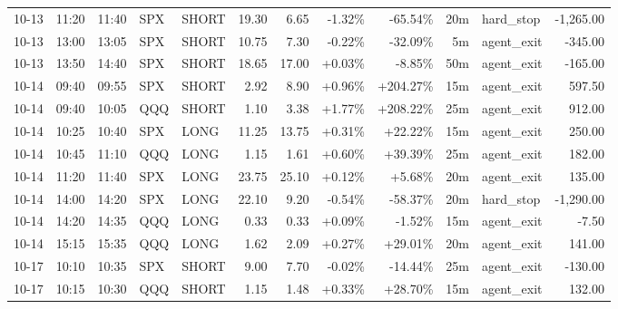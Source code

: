 \documentclass[11pt,a4paper]{article}
\begin{document}
\begin{center}
\begin{longtable}{>{\color{txtmain}}l l l l l r r r r r >{\color{txtmain}}l r}
10-13 & 11:20 & 11:40 & SPX & SHORT & 19.30 & 6.65 & \textcolor{lossred}{-1.32\%} & \textcolor{lossred}{-65.54\%} & 20m & hard\_stop & \textcolor{lossred}{-1,265.00} \\
10-13 & 13:00 & 13:05 & SPX & SHORT & 10.75 & 7.30 & \textcolor{lossred}{-0.22\%} & \textcolor{lossred}{-32.09\%} & 5m & agent\_exit & \textcolor{lossred}{-345.00} \\
10-13 & 13:50 & 14:40 & SPX & SHORT & 18.65 & 17.00 & \textcolor{wingreen}{+0.03\%} & \textcolor{lossred}{-8.85\%} & 50m & agent\_exit & \textcolor{lossred}{-165.00} \\
10-14 & 09:40 & 09:55 & SPX & SHORT & 2.92 & 8.90 & \textcolor{wingreen}{+0.96\%} & \textcolor{wingreen}{+204.27\%} & 15m & agent\_exit & \textcolor{wingreen}{597.50} \\
10-14 & 09:40 & 10:05 & QQQ & SHORT & 1.10 & 3.38 & \textcolor{wingreen}{+1.77\%} & \textcolor{wingreen}{+208.22\%} & 25m & agent\_exit & \textcolor{wingreen}{912.00} \\
10-14 & 10:25 & 10:40 & SPX & LONG & 11.25 & 13.75 & \textcolor{wingreen}{+0.31\%} & \textcolor{wingreen}{+22.22\%} & 15m & agent\_exit & \textcolor{wingreen}{250.00} \\
10-14 & 10:45 & 11:10 & QQQ & LONG & 1.15 & 1.61 & \textcolor{wingreen}{+0.60\%} & \textcolor{wingreen}{+39.39\%} & 25m & agent\_exit & \textcolor{wingreen}{182.00} \\
10-14 & 11:20 & 11:40 & SPX & LONG & 23.75 & 25.10 & \textcolor{wingreen}{+0.12\%} & \textcolor{wingreen}{+5.68\%} & 20m & agent\_exit & \textcolor{wingreen}{135.00} \\
10-14 & 14:00 & 14:20 & SPX & LONG & 22.10 & 9.20 & \textcolor{lossred}{-0.54\%} & \textcolor{lossred}{-58.37\%} & 20m & hard\_stop & \textcolor{lossred}{-1,290.00} \\
10-14 & 14:20 & 14:35 & QQQ & LONG & 0.33 & 0.33 & \textcolor{wingreen}{+0.09\%} & \textcolor{lossred}{-1.52\%} & 15m & agent\_exit & \textcolor{lossred}{-7.50} \\
10-14 & 15:15 & 15:35 & QQQ & LONG & 1.62 & 2.09 & \textcolor{wingreen}{+0.27\%} & \textcolor{wingreen}{+29.01\%} & 20m & agent\_exit & \textcolor{wingreen}{141.00} \\
10-17 & 10:10 & 10:35 & SPX & SHORT & 9.00 & 7.70 & \textcolor{lossred}{-0.02\%} & \textcolor{lossred}{-14.44\%} & 25m & agent\_exit & \textcolor{lossred}{-130.00} \\
10-17 & 10:15 & 10:30 & QQQ & SHORT & 1.15 & 1.48 & \textcolor{wingreen}{+0.33\%} & \textcolor{wingreen}{+28.70\%} & 15m & agent\_exit & \textcolor{wingreen}{132.00} \\

\end{longtable}
\end{center}
\end{document}
